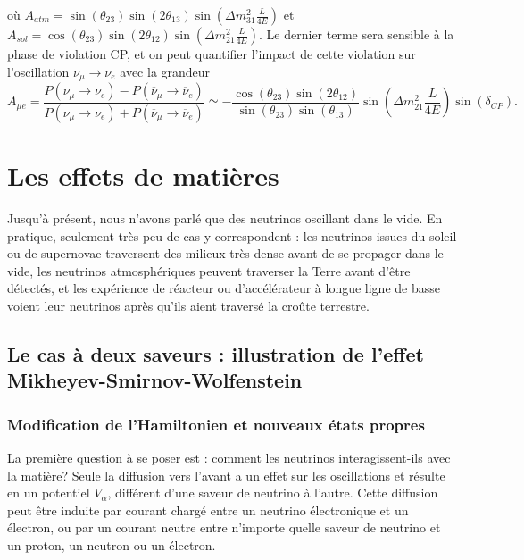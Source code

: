             où $A_{atm} = \sin(\theta_{23})\sin(2\theta_{13})\sin\left(\Delta m^2_{31}\frac{L}{4E}\right)$ et $A_{sol} =\cos(\theta_{23})\sin(2\theta_{12})\sin\left(\Delta m^2_{21}\frac{L}{4E}\right)$. Le dernier terme sera sensible à la phase de violation CP, et on peut quantifier l'impact de cette violation sur l'oscillation $\nu_{\mu}\to\nu_e$ avec la grandeur
            \begin{equation}\label{eq::CP_A_factor}
                A_{\mu e} = \frac{P(\nu_{\mu}\to\nu_e)-P(\overline{\nu}_{\mu}\to\overline{\nu}_e)}{P(\nu_{\mu}\to\nu_e)+P(\overline{\nu}_{\mu}\to\overline{\nu}_e)} \simeq -\frac{\cos(\theta_{23})\sin(2\theta_{12})}{\sin(\theta_{23})\sin(\theta_{13})}\sin\left(\Delta m^2_{21}\frac{L}{4E}\right)\sin(\delta_{CP}).
            \end{equation}


    \section{Les effets de matières}\label{sec::matter_effect}
        Jusqu'à présent, nous n'avons parlé que des neutrinos oscillant dans le vide. En pratique, seulement très peu de cas y correspondent : les neutrinos issues du soleil ou de supernovae traversent des milieux très dense avant de se propager dans le vide, les neutrinos atmosphériques peuvent traverser la Terre avant d'être détectés, et les expérience de réacteur ou d'accélérateur à longue ligne de basse voient leur neutrinos après qu'ils aient traversé la croûte terrestre.
        \subsection{Le cas à deux saveurs : illustration de l'effet Mikheyev-Smirnov-Wolfenstein}
            \subsubsection{Modification de l'Hamiltonien et nouveaux états propres}
            La première question à se poser est : comment les neutrinos interagissent-ils avec la matière? Seule la diffusion vers l'avant a un effet sur les oscillations\cite{Wolfenstein1978,Akhmedov2000} et résulte en un potentiel $V_{\alpha}$, différent d'une saveur de neutrino à l'autre. Cette diffusion peut être induite par courant chargé entre un neutrino électronique et un électron, ou par un courant neutre entre n'importe quelle saveur de neutrino et un proton, un neutron ou un électron.
            

